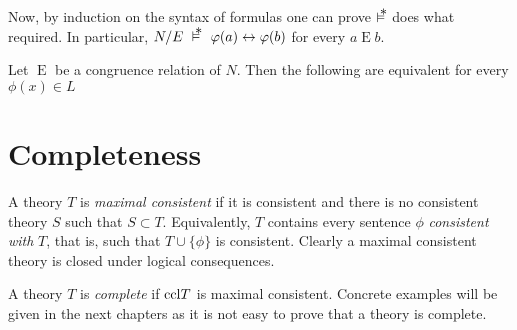 \documentclass[creche.tex]{subfiles}
\begin{document}
% 
% 
% 


Now, by induction on the syntax of formulas one can prove $\pmodels$ does what required.
In particular, $N/E\ \pmodels\ \phi(a)\iff\phi(b)$ for every $a\mathrel{E} b$.

\begin{proposition}\label{prop_pseudomodel}
Let $\mathrel{E}$ be a congruence relation of $N$.
Then the following are equivalent for every $\phi(x)\in L$


\QED
\end{proposition}



% 
% 
% 




\section{Completeness}

A theory $T$ is \emph{maximal consistent\/} if it is consistent and there is no consistent theory $S$ such that $S\subset T$.
Equivalently, $T$ contains every sentence $\phi$ \emph{consistent with\/} $T$, that is, such that $T\cup\{\phi\}$ is consistent.
Clearly a maximal consistent theory is closed under logical consequences.

A theory $T$ is \emph{complete\/} if ${\rm ccl} T$ is maximal consistent.
Concrete examples will be given in the next chapters as it is not easy to prove that a theory is complete.
\end{document}
